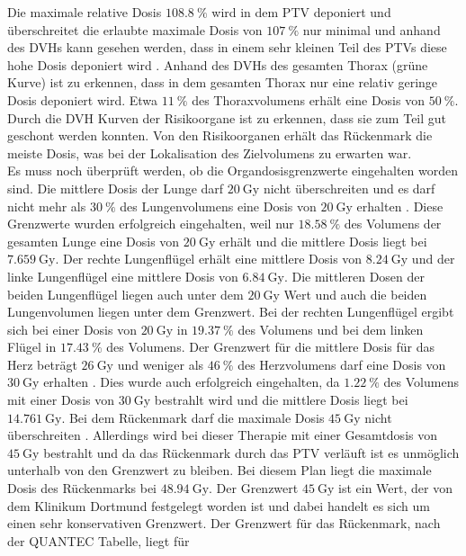 Die maximale relative Dosis $\SI{108,8}{\percent}$ wird in dem PTV deponiert und überschreitet die erlaubte maximale
Dosis von $\SI{107}{\percent}$ nur minimal und anhand des DVHs kann gesehen werden, dass in einem sehr kleinen Teil des PTVs
diese hohe Dosis deponiert wird \cite{ICRU}.
Anhand des DVHs des gesamten Thorax (grüne Kurve) ist zu erkennen, dass in dem gesamten Thorax nur eine relativ geringe Dosis deponiert wird.
Etwa $\SI{11}{\percent}$ des Thoraxvolumens erhält eine Dosis von  $\SI{50}{\percent}$. Durch die DVH Kurven der Risikoorgane ist zu erkennen,
dass sie zum Teil gut geschont werden konnten. Von den Risikoorganen erhält das Rückenmark die meiste Dosis, was bei der Lokalisation des Zielvolumens
zu erwarten war.\\
Es muss noch überprüft werden, ob die Organdosisgrenzwerte eingehalten worden sind.
Die mittlere Dosis der Lunge darf $\SI{20}{\gray}$ nicht überschreiten
und es darf nicht mehr als $\SI{30}{\percent}$ des Lungenvolumens eine Dosis von $\SI{20}{\gray}$ erhalten \cite{grenz}.
Diese Grenzwerte wurden erfolgreich eingehalten, weil nur $\SI{18,58}{\percent}$ des Volumens der gesamten Lunge eine
Dosis von $\SI{20}{\gray}$ erhält und die mittlere Dosis liegt bei $\SI{7,659}{\gray}$.
Der rechte Lungenflügel erhält eine mittlere Dosis von $\SI{8,24}{\gray}$ und der linke Lungenflügel eine mittlere Dosis von $\SI{6,84}{\gray}$.
Die mittleren Dosen der beiden Lungenflügel liegen auch unter dem $\SI{20}{\gray}$ Wert und auch die beiden Lungenvolumen liegen unter dem Grenzwert.
Bei der rechten Lungenflügel ergibt sich bei einer Dosis von $\SI{20}{\gray}$ in $\SI{19,37}{\percent}$ des Volumens und bei dem linken
Flügel in $\SI{17,43}{\percent}$ des Volumens.
Der Grenzwert für die mittlere Dosis
für das Herz beträgt $\SI{26}{\gray}$ und weniger als $\SI{46}{\percent}$ des Herzvolumens darf eine Dosis von $\SI{30}{\gray}$ erhalten \cite{grenz}.
Dies wurde auch erfolgreich eingehalten, da $\SI{1,22}{\percent}$ des Volumens mit einer Dosis von $\SI{30}{\gray}$ bestrahlt wird und die mittlere
Dosis liegt bei $\SI{14,761}{\gray}$.
Bei dem Rückenmark darf die maximale Dosis $\SI{45}{\gray}$ nicht überschreiten \cite{grenz}.
Allerdings wird bei dieser Therapie mit einer Gesamtdosis von $\SI{45}{\gray}$ bestrahlt und
da das Rückenmark durch das PTV verläuft ist es unmöglich unterhalb von den Grenzwert zu bleiben.
Bei diesem Plan liegt die maximale Dosis des Rückenmarks bei $\SI{48.94}{\gray}$.
Der Grenzwert $\SI{45}{\gray}$ ist ein Wert, der von dem Klinikum Dortmund festgelegt worden ist und dabei
handelt es sich um einen sehr konservativen Grenzwert. Der Grenzwert für das Rückenmark, nach der QUANTEC Tabelle, liegt für
